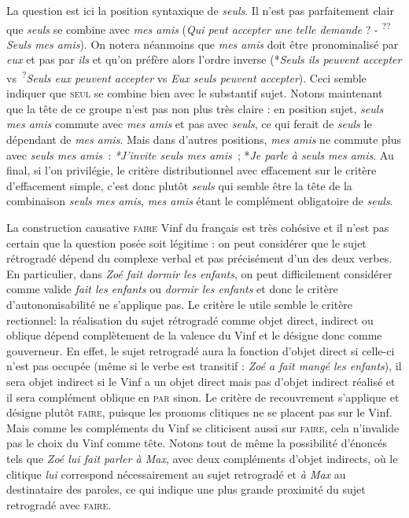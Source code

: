 {\begin{exe}
     La question est ici la position syntaxique de \textit{seuls}. Il n’est pas parfaitement clair que \textit{seuls} se combine avec \textit{mes amis} (\textit{Qui peut accepter une telle demande} ? - \textsuperscript{??}\textit{Seuls mes amis}). On notera néanmoins que \textit{mes amis} doit être pronominalisé par \textit{eux} et pas par \textit{ils} et qu’on préfère alors l’ordre inverse (*\textit{Seuls ils peuvent accepter} vs~\textsuperscript{?}\textit{Seuls eux peuvent accepter} vs \textit{Eux seuls peuvent accepter}). Ceci semble indiquer que \textsc{seul} se combine bien avec le substantif sujet. Notons maintenant que la tête de ce groupe n’est pas non plus très claire : en position sujet, \textit{seuls mes amis} commute avec \textit{mes amis} et pas avec \textit{seuls}, ce qui ferait de \textit{seuls} le dépendant de \textit{mes amis}. Mais dans d’autres positions, \textit{mes amis} ne commute plus avec \textit{seuls mes amis~}: \textit{*J’invite seuls mes amis~}; *\textit{Je parle à seuls mes amis}. Au final, si l’on privilégie, le critère distributionnel avec effacement sur le critère d’effacement simple, c’est donc plutôt \textit{seuls} qui semble être la tête de la combinaison \textit{seuls mes amis}, \textit{mes amis} étant le complément obligatoire de \textit{seuls}.
    \end{exe}

     La construction causative \textsc{faire} Vinf du français est très cohésive et il n’est pas certain que la question posée soit légitime : on peut considérer que le sujet rétrogradé dépend du complexe verbal et pas précisément d’un des deux verbes. En particulier, dans \textit{Zoé fait dormir les enfants}, on peut difficilement considérer comme valide \textit{fait les enfants} ou \textit{dormir les enfants} et donc le critère d’autonomisabilité ne s’applique pas. Le critère le utile semble le critère rectionnel: la réalisation du sujet rétrogradé comme objet direct, indirect ou oblique dépend complètement de la valence du Vinf et le désigne donc comme gouverneur. En effet, le sujet retrogradé aura la fonction d’objet direct si celle-ci n’est pas occupée (même si le verbe est transitif : \textit{Zoé a fait mangé les enfants}), il sera objet indirect si le Vinf a un objet direct mais pas d’objet indirect réalisé et il sera complément oblique en \textsc{par} sinon. Le critère de recouvrement s’applique et désigne plutôt \textsc{faire}, puisque les pronoms clitiques ne se placent pas sur le Vinf. Mais comme les compléments du Vinf se cliticisent aussi sur \textsc{faire}, cela n’invalide pas le choix du Vinf comme tête. Notons tout de même la possibilité d'énoncés tels que \textit{Zoé lui fait parler à Max}, avec deux compléments d'objet indirects, où
    le clitique \textit{lui} correspond nécessairement au sujet retrogradé et \textit{à Max} au destinataire des paroles, ce qui indique une plus grande proximité du sujet retrogradé avec \textsc{faire}.

}
